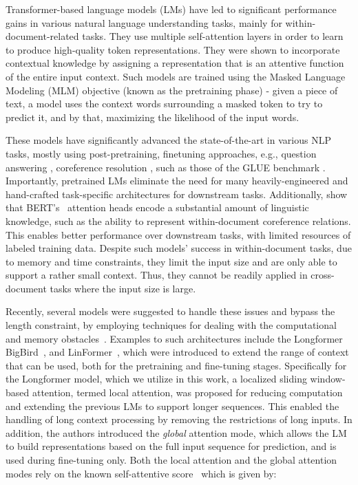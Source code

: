 \documentclass[11pt,a4paper]{article}
\begin{document}
\label{sec:background}
Transformer-based language models (LMs) \cite{devlin-etal-2019-bert, liu2019roberta, yang2019xlnet} have led to significant performance gains in various natural language understanding tasks, mainly for within-document-related tasks.  They use multiple self-attention layers in order to learn to produce high-quality token representations. They were shown to incorporate contextual knowledge by assigning a representation that is an attentive function of the entire input context. Such models are trained using the Masked Language Modeling (MLM) objective (known as the pretraining phase) - given a piece of text, a model uses the context words surrounding a masked token to try to predict it, and by that, maximizing the likelihood of the input words. 

These models have significantly advanced the state-of-the-art in various NLP tasks, mostly using post-pretraining, finetuning approaches, e.g., question answering \cite{yang2019xlnet}, coreference resolution \cite{joshi-etal-2019-bert}, such as those of the GLUE benchmark \cite{wang-etal-2018-glue}. Importantly, pretrained LMs eliminate
the need for many heavily-engineered and hand-crafted task-specific architectures for downstream tasks. Additionally, \citet{clark-etal-2019-bert} show that BERT’s~\cite{devlin-etal-2019-bert} attention heads encode a substantial amount of linguistic knowledge, such as the ability to represent within-document coreference relations. This enables better performance over downstream tasks, with limited resources of labeled training data.  Despite such models' success in within-document tasks, due to memory and time constraints, they limit the input size and are only able to support a rather small context. Thus, they cannot be readily applied in cross-document tasks where the input size is large.

Recently, several models were suggested to handle these issues and bypass the length constraint, by employing techniques for dealing with the computational and memory obstacles~\cite{tay2020long}. Examples to such architectures include the Longformer~\cite{beltagy2020longformer} BigBird~\cite{zaheer2020big}, and LinFormer~\cite{wang2020linformer}, which were introduced to extend the range of context that can be used, both for the pretraining and fine-tuning stages. Specifically for the Longformer model, which we utilize in this work, a localized sliding window-based attention, termed local attention, was proposed for reducing computation and extending the previous LMs to support longer sequences. This enabled the handling of long context processing by removing the restrictions of long inputs.
In addition, the authors introduced the \textit{global} attention mode, which allows the LM to build representations based on the full input sequence for prediction, and is used during fine-tuning only. Both the local attention and the global attention modes rely on the known self-attentive score~\cite{vaswani2017attention} which is given by:
\end{document}

